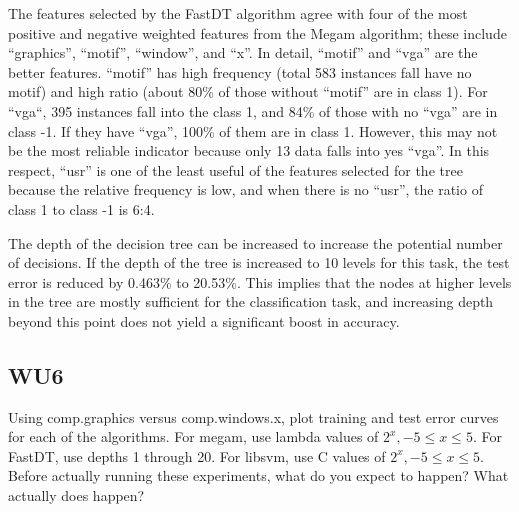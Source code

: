 \documentclass[a4paper,11pt]{article}
\begin{document}
The features selected by the FastDT algorithm agree with four of the most
positive and negative weighted features from the Megam algorithm; these 
include ``graphics'', ``motif'', ``window'', and ``x''. In detail, 
``motif'' and ``vga'' are the better features. ``motif'' has high frequency
(total 583 instances fall have no motif) and high ratio (about 80\% of
those without ``motif'' are in class 1). For ``vga``,  395 instances fall into
the class 1, and 84\% of those with no ``vga'' are in class -1. If they
have ``vga'', 100\% of them are in class 1. However, this may not be the
most reliable indicator because only 13 data falls into yes ``vga''.
In this respect, ``usr'' is one of the least useful of the features selected
for the tree because the relative frequency is low, and when there is no ``usr'',
the ratio of class 1 to class -1 is 6:4.

The depth of the decision tree can be increased to increase the potential number
of decisions. If the depth of the tree is increased to 10 levels for this task,
the test error is reduced by 0.463\% to 20.53\%. This implies that the nodes at higher
levels in the tree are mostly sufficient for the classification task, and increasing
depth beyond this point does not yield a significant boost in accuracy.

\subsection{WU6}
\textsf{Using comp.graphics versus comp.windows.x, plot training 
and test error curves for each of the algorithms. 
For megam, use lambda values of $2^x, -5 \leq x \leq 5$. 
For FastDT, use depths 1 through 20. 
For libsvm, use C values of $2^x,  -5 \leq x \leq 5$. 
Before actually running these experiments, what do you expect to happen? 
What actually does happen?}\\
\end{document}
